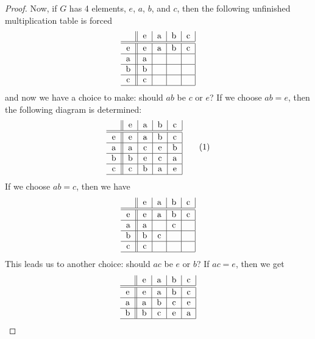 \documentclass{article}
\theoremstyle{definition}
\begin{document}
\begin{proof}
	Now, if $G$ has 4 elements, $e$, $a$, $b$, and $c$, then the following unfinished multiplication table is forced \begin{equation*}
		\begin{tabular}{ c || c | c | c | c | }
			  & e & a & b & c \\ \hline\hline
			e & e & a & b & c \\ \hline
			a & a &   &   &   \\ \hline
			b & b &   &   &   \\ \hline
			c & c &   &   &   \\ \hline
		\end{tabular}
	\end{equation*}
	and now we have a choice to make: should $ab$ be $c$ or $e$?
	If we choose $ab = e$, then the following diagram is determined: \begin{equation*}
		\begin{tabular}{ c || c | c | c | c | }
			  & e & a & b & c \\ \hline\hline
			e & e & a & b & c \\ \hline
			a & a & c & e & b \\ \hline
			b & b & e & c & a \\ \hline
			c & c & b & a & e \\ \hline
		\end{tabular} \tag{1}
	\end{equation*}
	If we choose $ab = c$, then we have \begin{equation*}
		\begin{tabular}{ c || c | c | c | c | }
			  & e & a & b & c \\ \hline\hline
			e & e & a & b & c \\ \hline
			a & a &   & c &   \\ \hline
			b & b & c &   &   \\ \hline
			c & c &   &   &   \\ \hline
		\end{tabular}
	\end{equation*}
	This leads us to another choice: should $ac$ be $e$ or $b$?
	If $ac = e$, then we get \begin{equation*}
		\begin{tabular}{ c || c | c | c | c | }
			  & e & a & b & c \\ \hline\hline
			e & e & a & b & c \\ \hline
			a & a & b & c & e \\ \hline
			b & b & c & e & a \\ \hline

\end{tabular}
\end{equation*}
\end{proof}
\end{document}
